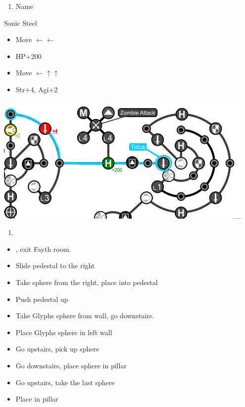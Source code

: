 \begin{enumerate}[resume]
	\item Name \shiva
\end{enumerate}
\begin{equip}
	\begin{itemize}
		\tidusf Sonic Steel
	\end{itemize}
\end{equip}
\vfill
\begin{spheregrid}
	\begin{itemize}
		\tidusf
		\begin{itemize}
			\item Move $\leftarrow\leftarrow$
			\item HP+200
			\item Move $\leftarrow\uparrow\uparrow$
			\item Str+4, Agi+2
		\end{itemize}
		\includegraphics[width=.8\columnwidth]{graphics/Tidus_Post_Seymour}
	\end{itemize}
\end{spheregrid}
\begin{enumerate}[resume]
	\item \formation{\rikku}{\tidus}{\yuna}
\end{enumerate}
\begin{trial}
	\begin{itemize}
		\item \save, exit Fayth room.
		\item Slide pedestal to the right
		\item Take sphere from the right, place into pedestal
		\item Push pedestal up
		\item Take Glyphs sphere from wall, go downstairs.
		\item Place Glyphs sphere in left wall
		\item Go upstairs, pick up sphere
		\item Go downstairs, place sphere in pillar
		\item Go upstairs, take the last sphere
		\item Place in pillar
	\end{itemize}
\end{trial}
